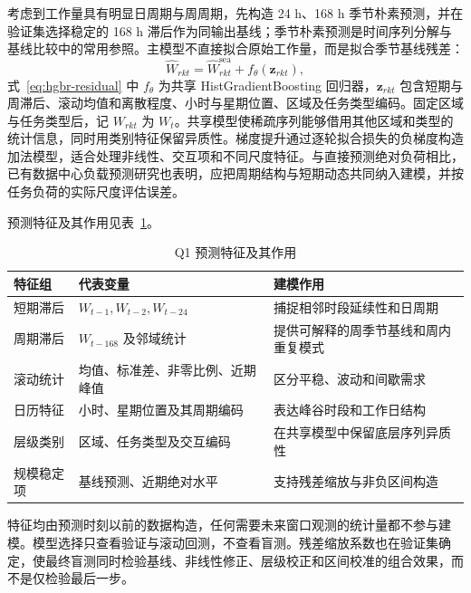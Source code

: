 考虑到工作量具有明显日周期与周周期，先构造 24 h、168 h 季节朴素预测，并在验证集选择稳定的 168 h 滞后作为同输出基线；季节朴素预测是时间序列分解与基线比较中的常用参照。主模型不直接拟合原始工作量，而是拟合季节基线残差：
\begin{equation}
  \hat W_{rkt}=\hat W^{\mathrm{sea}}_{rkt}+f_{\theta}(\boldsymbol z_{rkt}),
  \label{eq:hgbr-residual}
\end{equation}
式~\eqref{eq:hgbr-residual} 中 $f_{\theta}$ 为共享 HistGradientBoosting 回归器，$\boldsymbol z_{rkt}$ 包含短期与周滞后、滚动均值和离散程度、小时与星期位置、区域及任务类型编码。固定区域与任务类型后，记 $W_{rkt}$ 为 $W_t$。共享模型使稀疏序列能够借用其他区域和类型的统计信息，同时用类别特征保留异质性。梯度提升通过逐轮拟合损失的负梯度构造加法模型，适合处理非线性、交互项和不同尺度特征。与直接预测绝对负荷相比，已有数据中心负载预测研究也表明，应把周期结构与短期动态共同纳入建模，并按任务负荷的实际尺度评估误差。

预测特征及其作用见表~\ref{tab:q1-features}。

\begin{table}[H]
  \centering
  \caption{Q1 预测特征及其作用}
  \label{tab:q1-features}
  \small
  \begin{tabularx}{\textwidth}{p{}p{}X}
    \toprule
    特征组 & 代表变量 & 建模作用 \\
    \midrule
    短期滞后 & $W_{t-1},W_{t-2},W_{t-24}$ & 捕捉相邻时段延续性和日周期 \\
    周期滞后 & $W_{t-168}$ 及邻域统计 & 提供可解释的周季节基线和周内重复模式 \\
    滚动统计 & 均值、标准差、非零比例、近期峰值 & 区分平稳、波动和间歇需求 \\
    日历特征 & 小时、星期位置及其周期编码 & 表达峰谷时段和工作日结构 \\
    层级类别 & 区域、任务类型及交互编码 & 在共享模型中保留底层序列异质性 \\
    规模稳定项 & 基线预测、近期绝对水平 & 支持残差缩放与非负区间构造 \\
    \bottomrule
  \end{tabularx}
\end{table}

特征均由预测时刻以前的数据构造，任何需要未来窗口观测的统计量都不参与建模。模型选择只查看验证与滚动回测，不查看盲测。残差缩放系数也在验证集确定，使最终盲测同时检验基线、非线性修正、层级校正和区间校准的组合效果，而不是仅检验最后一步。

